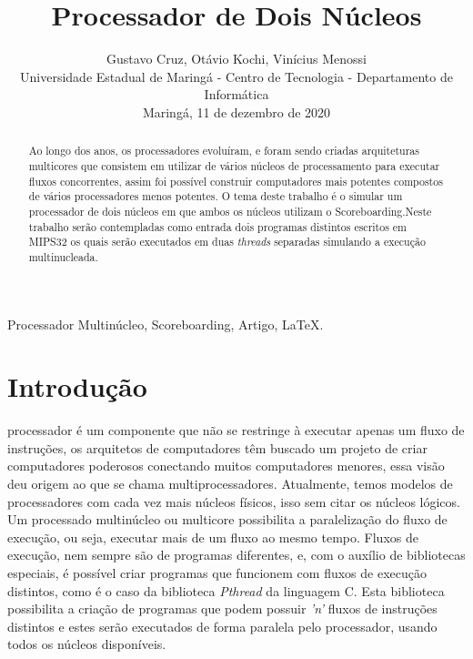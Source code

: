 \documentclass[journal]{IEEEtran}
\begin{document}
\title{Processador de Dois Núcleos}

\author{Gustavo Cruz,
        Otávio Kochi,
        Vinícius Menossi{
\begin{center}
    Universidade Estadual de Maringá - Centro de Tecnologia - Departamento de Informática
\end{center}}
{\begin{center}
    Maringá, 11 de dezembro de 2020
\end{center}}}

\maketitle

\begin{abstract}
Ao longo dos anos, os processadores evoluíram, e foram sendo criadas arquiteturas multicores que consistem em utilizar de vários núcleos de processamento para executar fluxos concorrentes, assim foi possível construir computadores mais potentes compostos de vários processadores menos potentes. O tema deste trabalho é o simular um processador de dois núcleos em que ambos os núcleos utilizam o Scoreboarding.Neste trabalho serão contempladas como entrada dois programas distintos escritos em MIPS32 os quais serão executados em duas \textit{threads} separadas simulando a execução multinucleada.
\end{abstract}

\begin{IEEEkeywords}
Processador Multinúcleo, Scoreboarding, Artigo, \LaTeX.
\end{IEEEkeywords}

\section{Introdução}

 processador é um componente que não se restringe à executar apenas um fluxo de instruções, os arquitetos de computadores têm buscado um projeto de criar computadores poderosos conectando muitos computadores menores, essa visão deu origem ao que se chama multiprocessadores. Atualmente, temos modelos de processadores com cada vez mais núcleos físicos, isso sem citar os núcleos lógicos. Um processado multinúcleo ou multicore possibilita a paralelização do fluxo de execução, ou seja, executar mais de um fluxo ao mesmo tempo. Fluxos de execução, nem sempre são de programas diferentes, e, com o auxílio de bibliotecas especiais, é possível criar programas que funcionem com fluxos de execução distintos, como é o caso da biblioteca \textit{Pthread} da linguagem C. Esta biblioteca possibilita a criação de programas que podem possuir \textit{'n'} fluxos de instruções distintos e estes serão executados de forma paralela pelo processador, usando todos os núcleos disponíveis.
\end{document}
